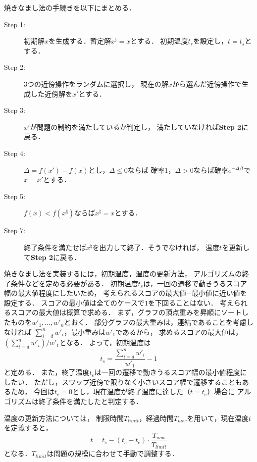焼きなまし法の手続きを以下にまとめる．
\begin{description}
  \item[Step 1:] 初期解$x$を生成する．暫定解$x^{\natural}=x$とする．
  初期温度$t_s$を設定し，$t=t_s$とする．
  \item[Step 2:] 3つの近傍操作をランダムに選択し，
  現在の解$x$から選んだ近傍操作で生成した近傍解を$x'$とする．
  \item[Step 3:] $x'$が問題の制約を満たしているか判定し，
  満たしていなければ\textbf{Step 2}に戻る．
  \item[Step 4:] $\Delta=f(x')-f(x)$とし，$\Delta \leq 0$ならば
  確率$1$，$\Delta > 0$ならば確率$e^{-\Delta/t}$で$x=x'$とする．
  \item[Step 5:] $f(x)<f(x^{\natural})$ならば$x^{\natural}=x$とする．
  \item[Step 7:] 終了条件を満たせば$x^{\natural}$を出力して終了．そうでなければ，
  温度$t$を更新して\textbf{Step 2}に戻る．
\end{description}

焼きなまし法を実装するには，初期温度，温度の更新方法，
アルゴリズムの終了条件などを定める必要がある．
初期温度$t_{s}$は，一回の遷移で動きうるスコア幅の最大値程度にしたいため，
考えられるスコアの最大値$-$最小値に近い値を設定する．
スコアの最小値は全てのケースで$1$を下回ることはない．
考えられるスコアの最大値は概算で求める．
まず，グラフの頂点重みを昇順にソートしたものを$w'_1,\ldots,w'_n$とおく．
部分グラフの最大重みは，連結であることを考慮しなければ
$\sum_{i=d}^n w'_i$，最小重みは$w'_1$であるから，
求めるスコアの最大値は，$(\sum_{i=d}^n w'_i)/w'_1$となる．
よって，初期温度は$$t_s=\frac{\sum_{i=d}^n w'_i}{w'_1}- 1$$と定める．
また，終了温度$t_e$は一回の遷移で動きうるスコア幅の最小値程度にしたい．
ただし，スワップ近傍で限りなく小さいスコア幅で遷移することもあるため，
今回は$t_e=0$とし，現在温度が終了温度に達した（$t=t_e$）場合に
アルゴリズムは終了条件を満たしたと判定する．

温度の更新方法については，
制限時間$T_{limit}$，経過時間$T_{now}$を用いて，現在温度$t$を定義すると，
$$t=t_s - (t_s - t_e)\cdot \frac{T_{now}}{T_{limit}}$$
となる．$T_{limit}$は問題の規模に合わせて手動で調整する．

